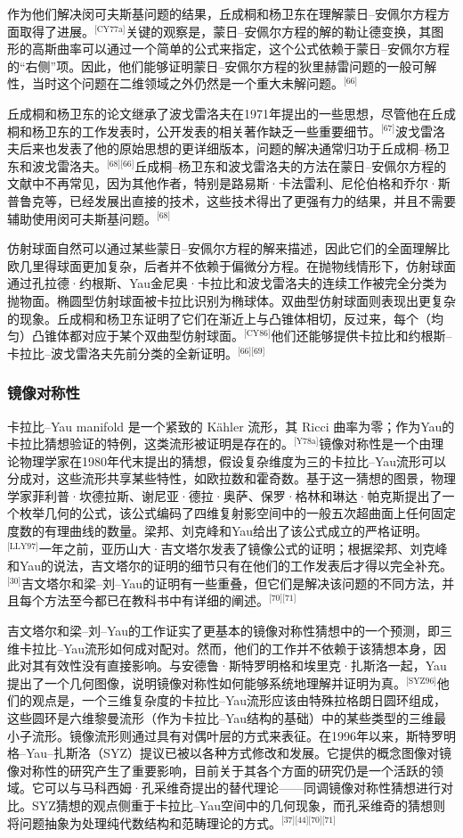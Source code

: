 作为他们解决闵可夫斯基问题的结果，丘成桐和杨卫东在理解蒙日–安佩尔方程方面取得了进展。\(^\text{[CY77a]}\)关键的观察是，蒙日–安佩尔方程的解的勒让德变换，其图形的高斯曲率可以通过一个简单的公式来指定，这个公式依赖于蒙日–安佩尔方程的“右侧”项。因此，他们能够证明蒙日–安佩尔方程的狄里赫雷问题的一般可解性，当时这个问题在二维领域之外仍然是一个重大未解问题。\(^\text{[66]}\)

丘成桐和杨卫东的论文继承了波戈雷洛夫在1971年提出的一些思想，尽管他在丘成桐和杨卫东的工作发表时，公开发表的相关著作缺乏一些重要细节。\(^\text{[67]}\)波戈雷洛夫后来也发表了他的原始思想的更详细版本，问题的解决通常归功于丘成桐–杨卫东和波戈雷洛夫。\(^\text{[68][66]}\)丘成桐–杨卫东和波戈雷洛夫的方法在蒙日–安佩尔方程的文献中不再常见，因为其他作者，特别是路易斯·卡法雷利、尼伦伯格和乔尔·斯普鲁克等，已经发展出直接的技术，这些技术得出了更强有力的结果，并且不需要辅助使用闵可夫斯基问题。\(^\text{[68]}\)

仿射球面自然可以通过某些蒙日–安佩尔方程的解来描述，因此它们的全面理解比欧几里得球面更加复杂，后者并不依赖于偏微分方程。在抛物线情形下，仿射球面通过孔拉德·约根斯、Yau金尼奥·卡拉比和波戈雷洛夫的连续工作被完全分类为抛物面。椭圆型仿射球面被卡拉比识别为椭球体。双曲型仿射球面则表现出更复杂的现象。丘成桐和杨卫东证明了它们在渐近上与凸锥体相切，反过来，每个（均匀）凸锥体都对应于某个双曲型仿射球面。\(^\text{[CY86]}\)他们还能够提供卡拉比和约根斯–卡拉比–波戈雷洛夫先前分类的全新证明。\(^\text{[66][69]}\)
\subsubsection{镜像对称性}   
卡拉比–Yau manifold 是一个紧致的 Kähler 流形，其 Ricci 曲率为零；作为Yau的卡拉比猜想验证的特例，这类流形被证明是存在的。\(^\text{[Y78a]}\)镜像对称性是一个由理论物理学家在1980年代末提出的猜想，假设复杂维度为三的卡拉比–Yau流形可以分成对，这些流形共享某些特性，如欧拉数和霍奇数。基于这一猜想的图景，物理学家菲利普·坎德拉斯、谢尼亚·德拉·奥萨、保罗·格林和琳达·帕克斯提出了一个枚举几何的公式，该公式编码了四维复射影空间中的一般五次超曲面上任何固定度数的有理曲线的数量。梁邦、刘克峰和Yau给出了该公式成立的严格证明。\(^\text{[LLY97]}\)一年之前，亚历山大·吉文塔尔发表了镜像公式的证明；根据梁邦、刘克峰和Yau的说法，吉文塔尔的证明的细节只有在他们的工作发表后才得以完全补充。\(^\text{[30]}\)吉文塔尔和梁–刘–Yau的证明有一些重叠，但它们是解决该问题的不同方法，并且每个方法至今都已在教科书中有详细的阐述。\(^\text{[70][71]}\)

吉文塔尔和梁–刘–Yau的工作证实了更基本的镜像对称性猜想中的一个预测，即三维卡拉比–Yau流形如何成对配对。然而，他们的工作并不依赖于该猜想本身，因此对其有效性没有直接影响。与安德鲁·斯特罗明格和埃里克·扎斯洛一起，Yau提出了一个几何图像，说明镜像对称性如何能够系统地理解并证明为真。\(^\text{[SYZ96]}\)他们的观点是，一个三维复杂度的卡拉比–Yau流形应该由特殊拉格朗日圆环组成，这些圆环是六维黎曼流形（作为卡拉比–Yau结构的基础）中的某些类型的三维最小子流形。镜像流形则通过具有对偶叶层的方式来表征。在1996年以来，斯特罗明格–Yau–扎斯洛（SYZ）提议已被以各种方式修改和发展。它提供的概念图像对镜像对称性的研究产生了重要影响，目前关于其各个方面的研究仍是一个活跃的领域。它可以与马科西姆·孔采维奇提出的替代理论——同调镜像对称性猜想进行对比。SYZ猜想的观点侧重于卡拉比–Yau空间中的几何现象，而孔采维奇的猜想则将问题抽象为处理纯代数结构和范畴理论的方式。\(^\text{[37][44][70][71]}\)
